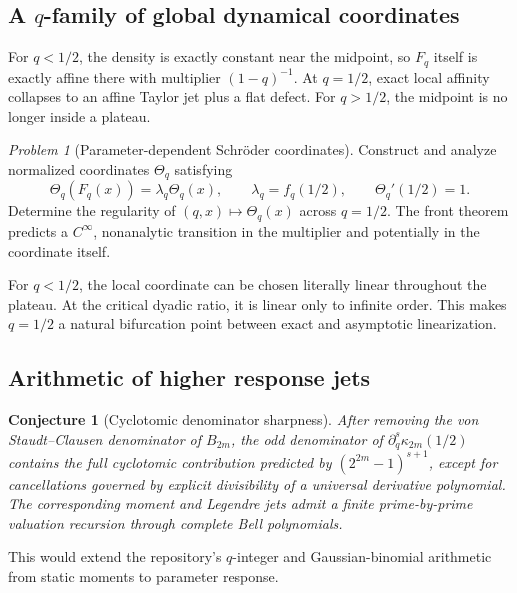 \documentclass[11pt,oneside]{article}
\newtheorem{conjecture}[theorem]{Conjecture}
\theoremstyle{definition}
\theoremstyle{remark}
\newtheorem{problem}[theorem]{Problem}
\begin{document}
\subsection{A \texorpdfstring{\(q\)}{q}-family of global dynamical coordinates}

For \(q<1/2\), the density is exactly constant near the midpoint, so \(F_q\) itself is exactly
affine there with multiplier \((1-q)^{-1}\).  At \(q=1/2\), exact local affinity collapses to an
affine Taylor jet plus a flat defect.  For \(q>1/2\), the midpoint is no longer inside a
plateau.

\begin{problem}[Parameter-dependent Schr\"oder coordinates]
\label{prob:q-theta}
Construct and analyze normalized coordinates \(\Theta_q\) satisfying
\begin{equation}
 \Theta_q(F_q(x))=\lambda_q\Theta_q(x),
 \qquad
 \lambda_q=f_q(1/2),
 \qquad
 \Theta_q'(1/2)=1.
 \label{eq:q-schroeder}
\end{equation}
Determine the regularity of \((q,x)\mapsto\Theta_q(x)\) across \(q=1/2\).  The front theorem
predicts a \(C^\infty\), nonanalytic transition in the multiplier and potentially in the
coordinate itself.
\end{problem}

For \(q<1/2\), the local coordinate can be chosen literally linear throughout the plateau.
At the critical dyadic ratio, it is linear only to infinite order.  This makes
\(q=1/2\) a natural bifurcation point between exact and asymptotic linearization.

\subsection{Arithmetic of higher response jets}

\begin{conjecture}[Cyclotomic denominator sharpness]
\label{conj:denominators}
After removing the von Staudt--Clausen denominator of \(B_{2m}\), the odd denominator of
\(
 \partial_q^s\kappa_{2m}(1/2)
\)
contains the full cyclotomic contribution predicted by
\((2^{2m}-1)^{s+1}\), except for cancellations governed by explicit divisibility of a
universal derivative polynomial.  The corresponding moment and Legendre jets admit a finite
prime-by-prime valuation recursion through complete Bell polynomials.
\end{conjecture}

This would extend the repository's \(q\)-integer and Gaussian-binomial arithmetic from static
moments to parameter response.
\end{document}
